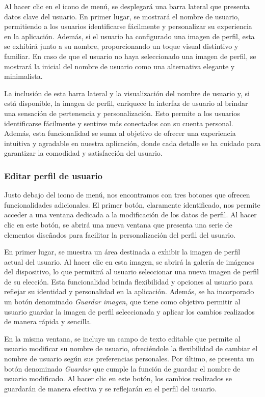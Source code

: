 \documentclass{article}
\begin{document}
Al hacer clic en el icono de menú, se desplegará una barra lateral que presenta datos clave del usuario. En primer lugar, se mostrará el nombre de usuario, permitiendo a los usuarios identificarse fácilmente y personalizar su experiencia en la aplicación. Además, si el usuario ha configurado una imagen de perfil, esta se exhibirá junto a su nombre, proporcionando un toque visual distintivo y familiar. En caso de que el usuario no haya seleccionado una imagen de perfil, se mostrará la inicial del nombre de usuario como una alternativa elegante y minimalista.

La inclusión de esta barra lateral y la visualización del nombre de usuario y, si está disponible, la imagen de perfil, enriquece la interfaz de usuario al brindar una sensación de pertenencia y personalización. Esto permite a los usuarios identificarse fácilmente y sentirse más conectados con su cuenta personal. Además, esta funcionalidad se suma al objetivo de ofrecer una experiencia intuitiva y agradable en nuestra aplicación, donde cada detalle se ha cuidado para garantizar la comodidad y satisfacción del usuario.

\subsubsection{Editar perfil de usuario}

Justo debajo del icono de menú, nos encontramos con tres botones que ofrecen funcionalidades adicionales. El primer botón, claramente identificado, nos permite acceder a una ventana dedicada a la modificación de los datos de perfil. Al hacer clic en este botón, se abrirá una nueva ventana que presenta una serie de elementos diseñados para facilitar la personalización del perfil del usuario.

En primer lugar, se muestra un área destinada a exhibir la imagen de perfil actual del usuario. Al hacer clic en esta imagen, se abrirá la galería de imágenes del dispositivo, lo que permitirá al usuario seleccionar una nueva imagen de perfil de su elección. Esta funcionalidad brinda flexibilidad y opciones al usuario para reflejar su identidad y personalidad en la aplicación. Además, se ha incorporado un botón denominado \textit{Guardar imagen}, que tiene como objetivo permitir al usuario guardar la imagen de perfil seleccionada y aplicar los cambios realizados de manera rápida y sencilla.

En la misma ventana, se incluye un campo de texto editable que permite al usuario modificar su nombre de usuario, ofreciéndole la flexibilidad de cambiar el nombre de usuario según sus preferencias personales. Por último, se presenta un botón denominado \textit{Guardar} que cumple la función de guardar el nombre de usuario modificado. Al hacer clic en este botón, los cambios realizados se guardarán de manera efectiva y se reflejarán en el perfil del usuario.
\end{document}
